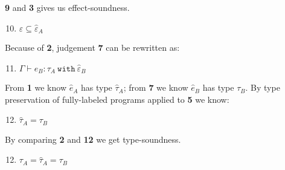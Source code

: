 \documentclass{llncs}
\newcommand{\keywadj}[1]{\mathtt{#1}}
\newcommand{\keyw}[1]{\keywadj{#1}~}
\newcommand{\type}[2]{
	#1~\keyw{with} #2
}
\begin{document}
{\noindent
\textbf{9} and \textbf{3} gives us effect-soundness.

\begin{adjustwidth}{1.5em}{0em}
\begin{enumerate}
	\setcounter{enumi}{9}
	\item $\varepsilon \subseteq \hat \varepsilon_A$ \\
\end{enumerate}
\end{adjustwidth}


\noindent
Because of \textbf{2}, judgement \textbf{7} can be rewritten as:

\begin{adjustwidth}{1.5em}{0em}
\begin{enumerate}
	\setcounter{enumi}{10}
	\item $\Gamma \vdash \hat e_B : \type{\tau_A}{\hat \varepsilon_B}$ \\
\end{enumerate}
\end{adjustwidth}

\noindent
From \textbf{1} we know $\hat e_A$ has type $\hat \tau_A$; from \textbf{7} we know $\hat e_B$ has type $\tau_B$. By type preservation of fully-labeled programs applied to \textbf{5} we know:

\begin{adjustwidth}{1.5em}{0em}
\begin{enumerate}
	\setcounter{enumi}{11}
	\item $\hat \tau_A = \tau_B$ \\
\end{enumerate}
\end{adjustwidth}

\noindent
By comparing \textbf{2} and \textbf{12} we get type-soundness.

\begin{adjustwidth}{1.5em}{0em}
\begin{enumerate}
	\setcounter{enumi}{11}
	\item $\tau_A = \hat \tau_A = \tau_B$
\end{enumerate}
\end{adjustwidth}
}
\end{document}
